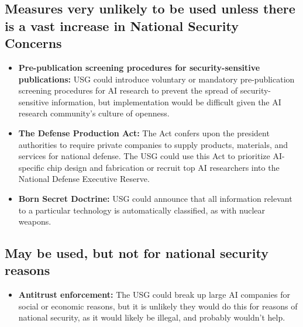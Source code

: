 \documentclass{article}
\begin{document}
\begin{multicols}{2}
\subsection{Measures very unlikely to be used unless there is a vast increase in National Security Concerns}
\begin{itemize}
\item \textbf{Pre-publication screening procedures for security-sensitive publications:} USG could introduce voluntary or mandatory pre-publication screening procedures for AI research to prevent the spread of security-sensitive information, but implementation would be difficult given the AI research community's culture of openness.
\item \textbf{The Defense Production Act:} The Act confers upon the president authorities to require private companies to supply products, materials, and services for national defense. The USG could use this Act to prioritize AI-specific chip design and fabrication or recruit top AI researchers into the National Defense Executive Reserve.
\item \textbf{Born Secret Doctrine:} USG could announce that all information relevant to a particular technology is automatically classified, as with nuclear weapons. 
\end{itemize}
\subsection{May be used, but not for national security reasons}
\begin{itemize}
\item \textbf{Antitrust enforcement:} The USG could break up large AI companies for social or economic reasons, but it is unlikely they would do this for reasons of national security, as it would likely be illegal, and probably wouldn't help.
\end{itemize}


\end{multicols}
\end{document}
